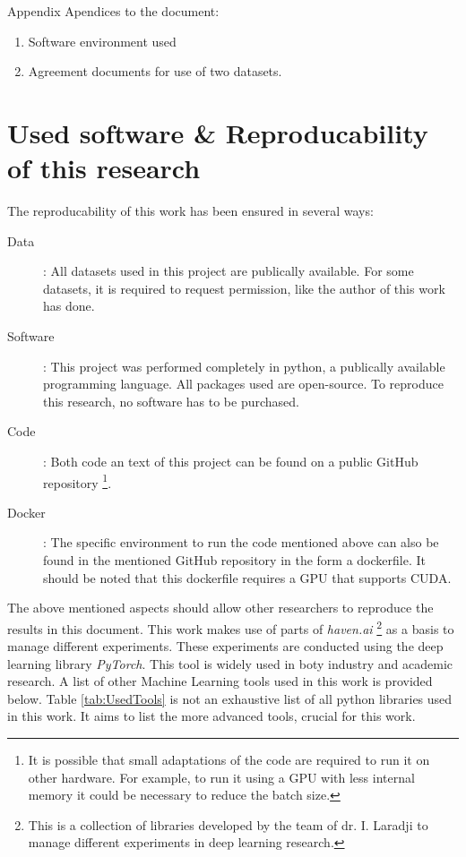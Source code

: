 \appendix

\begin{partwithabstract}{Appendix}
  Apendices to the document:
  \begin{enumerate}
    \item Software environment used
    \item Agreement documents for use of two datasets.
  \end{enumerate}
\end{partwithabstract}
\restoregeometry

\chapter{Used software \& Reproducability of this research}

The reproducability of this work has been ensured in several ways:
\begin{description}
  \item[Data]: All datasets used in this project are publically available. For some datasets, it is required to request permission, like the author of this work has done.
  \item[Software]: This project was performed completely in python, a publically available programming language. 
  All packages used are open-source.
  To reproduce this research, no software has to be purchased. 
  \item[Code]: Both code an text of this project can be found on a public GitHub repository
  \footnote{It is possible that small adaptations of the code are required to run it on other hardware. For example, to run it using a GPU with less internal memory it could be necessary to reduce the batch size.}. 
  \item[Docker]: The specific environment to run the code mentioned above can also be found in the mentioned GitHub repository in the form a dockerfile.
  It should be noted that this dockerfile requires a GPU that supports CUDA.   
\end{description}

The above mentioned aspects should allow other researchers to reproduce the results in this document.
This work makes use of parts of \textit{haven.ai} \footnote{This is a collection of libraries developed by the team of dr. I. Laradji to manage different experiments in deep learning research.} 
as a basis to manage different experiments.
These experiments are conducted using the deep learning library \textit{PyTorch}.
This tool is widely used in boty industry and academic research.
A list of other Machine Learning tools used in this work is provided below.
Table \ref{tab:UsedTools} is not an exhaustive list of all  python libraries used in this work.
It aims to list the more advanced tools, crucial for this work.

